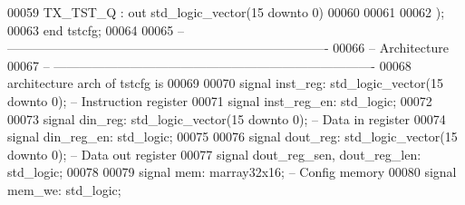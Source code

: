 \begin{DoxyCode}
00059         \textcolor{vhdlchar}{TX_TST_Q}                    \textcolor{vhdlchar}{:} \textcolor{keywordflow}{out} \textcolor{comment}{std\_logic\_vector}\textcolor{vhdlchar}{(}\textcolor{vhdllogic}{}\textcolor{vhdllogic}{15} \textcolor{keywordflow}{downto} \textcolor{vhdllogic}{}\textcolor{vhdllogic}{0}\textcolor{vhdlchar}{)}
00060 
00061 
00062     \textcolor{vhdlchar}{)};
00063 \textcolor{keywordflow}{end} \textcolor{vhdlchar}{tstcfg};
00064 
00065 \textcolor{keyword}{-- ----------------------------------------------------------------------------}
00066 \textcolor{keyword}{-- Architecture}
00067 \textcolor{keyword}{-- ----------------------------------------------------------------------------}
00068 \textcolor{keywordflow}{architecture} arch \textcolor{keywordflow}{of} tstcfg is
00069 
00070     \textcolor{keywordflow}{signal} \textcolor{vhdlchar}{inst_reg}\textcolor{vhdlchar}{:} \textcolor{comment}{std\_logic\_vector}\textcolor{vhdlchar}{(}\textcolor{vhdllogic}{}\textcolor{vhdllogic}{15} \textcolor{keywordflow}{downto} \textcolor{vhdllogic}{}\textcolor{vhdllogic}{0}\textcolor{vhdlchar}{)};\textcolor{keyword}{     -- Instruction register}
00071     \textcolor{keywordflow}{signal} \textcolor{vhdlchar}{inst_reg_en}\textcolor{vhdlchar}{:} \textcolor{comment}{std\_logic};
00072 
00073     \textcolor{keywordflow}{signal} \textcolor{vhdlchar}{din_reg}\textcolor{vhdlchar}{:} \textcolor{comment}{std\_logic\_vector}\textcolor{vhdlchar}{(}\textcolor{vhdllogic}{}\textcolor{vhdllogic}{15} \textcolor{keywordflow}{downto} \textcolor{vhdllogic}{}\textcolor{vhdllogic}{0}\textcolor{vhdlchar}{)};\textcolor{keyword}{      -- Data in register}
00074     \textcolor{keywordflow}{signal} \textcolor{vhdlchar}{din_reg_en}\textcolor{vhdlchar}{:} \textcolor{comment}{std\_logic};
00075     
00076     \textcolor{keywordflow}{signal} \textcolor{vhdlchar}{dout_reg}\textcolor{vhdlchar}{:} \textcolor{comment}{std\_logic\_vector}\textcolor{vhdlchar}{(}\textcolor{vhdllogic}{}\textcolor{vhdllogic}{15} \textcolor{keywordflow}{downto} \textcolor{vhdllogic}{}\textcolor{vhdllogic}{0}\textcolor{vhdlchar}{)};\textcolor{keyword}{     -- Data out register}
00077     \textcolor{keywordflow}{signal} \textcolor{vhdlchar}{dout_reg_sen}\textcolor{vhdlchar}{,} \textcolor{vhdlchar}{dout_reg_len}\textcolor{vhdlchar}{:} \textcolor{comment}{std\_logic};
00078     
00079     \textcolor{keywordflow}{signal} \textcolor{vhdlchar}{mem}\textcolor{vhdlchar}{:} \textcolor{vhdlchar}{marray32x16};\textcolor{keyword}{                                    -- Config memory}
00080     \textcolor{keywordflow}{signal} \textcolor{vhdlchar}{mem_we}\textcolor{vhdlchar}{:} \textcolor{comment}{std\_logic};

\end{DoxyCode}
